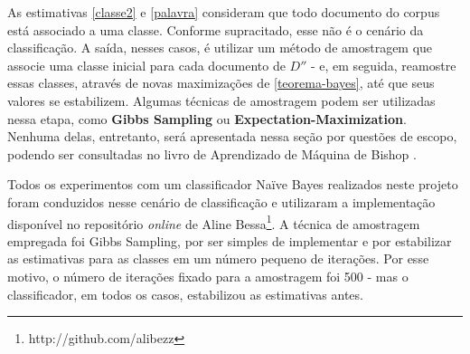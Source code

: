 As estimativas \ref{classe2} e \ref{palavra} consideram que todo documento do corpus está associado a uma classe. Conforme supracitado, esse não é o cenário da classificação. A saída, nesses casos, é utilizar um método de amostragem que associe uma classe inicial para cada documento de  \ensuremath{D''} - e, em seguida, reamostre essas classes, através de novas maximizações de \ref{teorema-bayes}, até que seus valores se estabilizem. Algumas técnicas de amostragem podem ser utilizadas nessa etapa, como \textbf{Gibbs Sampling} ou \textbf{Expectation-Maximization}. Nenhuma delas, entretanto, será apresentada nessa seção por questões de escopo, podendo ser consultadas no livro de Aprendizado de Máquina de Bishop \cite{bishop}. 

Todos os experimentos com um classificador Naïve Bayes realizados neste projeto foram conduzidos nesse cenário de classificação e utilizaram a implementação disponível no repositório \emph{online} de Aline Bessa\footnote{http://github.com/alibezz}.  A técnica de amostragem empregada foi Gibbs Sampling, por ser simples de implementar e por estabilizar as estimativas para as classes em um número pequeno de iterações. Por esse motivo, o número de iterações fixado para a amostragem foi 500 - mas o classificador, em todos os casos, estabilizou as estimativas antes. %





